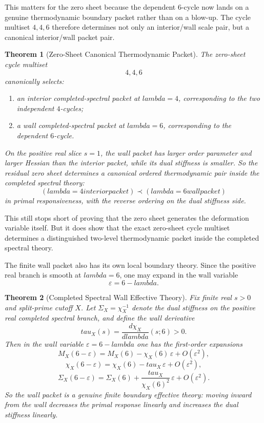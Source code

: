 \documentclass[12pt,a4paper]{article}
\def\mathcal#1{#1}%
\def\text#1{#1}%
\def\lambda{lambda}%
\def\tau{tau}%
\newtheorem{theorem}{Theorem}[section]
\theoremstyle{definition}
\begin{document}
This matters for the zero sheet because the dependent $6$-cycle now lands on a genuine thermodynamic boundary packet rather than on a blow-up. The cycle multiset $4,4,6$ therefore determines not only an interior/wall scale pair, but a canonical interior/wall packet pair.

\begin{theorem}[Zero-Sheet Canonical Thermodynamic Packet]
The zero-sheet cycle multiset
\[
4,4,6
\]
canonically selects:
\begin{enumerate}
\item an interior completed-spectral packet at $\lambda=4$, corresponding to the two independent $4$-cycles;
\item a wall completed-spectral packet at $\lambda=6$, corresponding to the dependent $6$-cycle.
\end{enumerate}
On the positive real slice $s=1$, the wall packet has larger order parameter and larger Hessian than the interior packet, while its dual stiffness is smaller. So the residual zero sheet determines a canonical ordered thermodynamic pair inside the completed spectral theory:
\[
(\lambda=4\text{ interior packet})
\prec
(\lambda=6\text{ wall packet})
\]
in primal responsiveness, with the reverse ordering on the dual stiffness side.
\end{theorem}

This still stops short of proving that the zero sheet generates the deformation variable itself. But it does show that the exact zero-sheet cycle multiset determines a distinguished two-level thermodynamic packet inside the completed spectral theory.

The finite wall packet also has its own local boundary theory. Since the positive real branch is smooth at $\lambda=6$, one may expand in the wall variable
\[
\varepsilon=6-\lambda.
\]

\begin{theorem}[Completed Spectral Wall Effective Theory]
Fix finite real $s>0$ and split-prime cutoff $X$. Let $\Sigma_X=\chi_X^{-1}$ denote the dual stiffness on the positive real completed spectral branch, and define the wall derivative
\[
\tau_X(s)=\frac{d\chi_X}{d\lambda}(s;6)>0.
\]
Then in the wall variable $\varepsilon=6-\lambda$ one has the first-order expansions
\[
\mathcal M_X(6-\varepsilon)=\mathcal M_X(6)-\chi_X(6)\,\varepsilon+O(\varepsilon^2),
\]
\[
\chi_X(6-\varepsilon)=\chi_X(6)-\tau_X\,\varepsilon+O(\varepsilon^2),
\]
\[
\Sigma_X(6-\varepsilon)=\Sigma_X(6)+\frac{\tau_X}{\chi_X(6)^2}\,\varepsilon+O(\varepsilon^2).
\]
So the wall packet is a genuine finite boundary effective theory: moving inward from the wall decreases the primal response linearly and increases the dual stiffness linearly.
\end{theorem}
\end{document}
